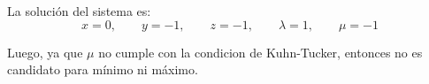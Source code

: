 \begin{enumerate}
\begin{enumerate}[\bfseries a)]
\begin{enumerate}[1.]
			La solución del sistema es:
			$$x=0,\qquad y=-1,\qquad z=-1,\qquad \lambda=1,\qquad \mu=-1$$

			Luego, ya que $\mu$ no cumple con la condicion de Kuhn-Tucker, entonces no es candidato para mínimo ni máximo.



		\end{enumerate}

	\end{enumerate}

\end{enumerate}




